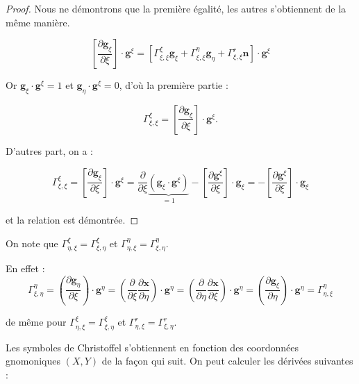 \begin{proof}
Nous ne démontrons que la première égalité, les autres s'obtiennent de la même manière.

$$\left[ \dfrac{\partial \mathbf{g}_{\xi}}{\partial \xi} \right] \cdot \mathbf{g}^{\xi} = \left[ \Gamma_{\xi,\xi}^{\xi} \mathbf{g}_{\xi} + \Gamma_{\xi,\xi}^{\eta} \mathbf{g}_{\eta} + \Gamma_{\xi,\xi}^r \mathbf{n}\right] \cdot \mathbf{g}^{\xi}$$

Or $\mathbf{g}_{\xi} \cdot \mathbf{g}^{\xi} = 1$ et $\mathbf{g}_{\eta} \cdot \mathbf{g}^{\xi} = 0$, d'où la première partie :

$$\Gamma_{\xi,\xi}^{\xi} = \left[ \dfrac{\partial \mathbf{g}_{\xi}}{\partial \xi} \right] \cdot \mathbf{g}^{\xi}.$$

D'autres part, on a :

$$\Gamma_{\xi,\xi}^{\xi} = \left[ \dfrac{\partial \mathbf{g}_{\xi}}{\partial \xi} \right] \cdot \mathbf{g}^{\xi} = \dfrac{\partial}{\partial \xi}  \underbrace{\left(\mathbf{g}_{\xi} \cdot \mathbf{g}^{\xi}\right)}_{=1}  - \left[ \dfrac{\partial \mathbf{g}^{\xi}}{\partial \xi}  \right] \cdot \mathbf{g}_{\xi} = - \left[ \dfrac{\partial \mathbf{g}^{\xi}}{\partial \xi}  \right] \cdot \mathbf{g}_{\xi}$$

et la relation est démontrée.
\end{proof}

\begin{remarque}
On note que $\Gamma_{\eta,\xi}^{\xi}=\Gamma_{\xi,\eta}^{\xi}$ et $\Gamma_{\eta,\xi}^{\eta}=\Gamma_{\xi,\eta}^{\eta}$.

En effet :
$$\Gamma_{\xi, \eta}^{\eta} = \left( \dfrac{\partial \mathbf{g}_{\eta}}{\partial \xi} \right) \cdot \mathbf{g}^{\eta} = \left( \dfrac{\partial}{\partial \xi} \dfrac{\partial \mathbf{x}}{\partial \eta} \right) \cdot \mathbf{g}^{\eta} = \left( \dfrac{\partial}{\partial \eta} \dfrac{\partial \mathbf{x}}{\partial \xi} \right) \cdot \mathbf{g}^{\eta} = \left( \dfrac{\partial \mathbf{g}_{\xi}}{\partial \eta} \right) \cdot \mathbf{g}^{\eta} = \Gamma_{\eta, \xi}^{\eta}$$

de même pour $\Gamma_{\eta,\xi}^{\xi}=\Gamma_{\xi,\eta}^{\xi}$ et $\Gamma_{\eta,\xi}^{r}=\Gamma_{\xi,\eta}^{r}$.
\end{remarque}

Les symboles de Christoffel s'obtiennent en fonction des coordonnées gnomoniques $(X,Y)$ de la façon qui suit.
On peut calculer les dérivées suivantes :

